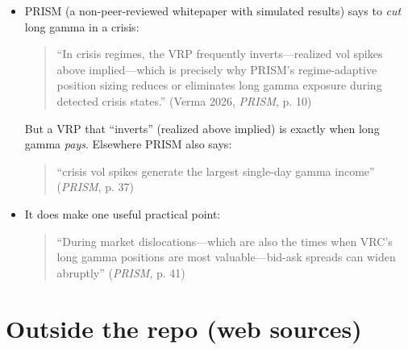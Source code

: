 \documentclass{article}
\begin{document}
\begin{itemize}

\item PRISM (a non-peer-reviewed whitepaper with simulated results) says to \emph{cut} long gamma in a crisis:

\begin{quote}``In crisis regimes, the VRP frequently inverts---realized vol spikes above implied---which is precisely why PRISM's regime-adaptive position sizing reduces or eliminates long gamma exposure during detected crisis states.'' (Verma 2026, \emph{PRISM}, p. 10)\end{quote}

But a VRP that ``inverts'' (realized above implied) is exactly when long gamma \emph{pays}. Elsewhere PRISM also says:

\begin{quote}``crisis vol spikes generate the largest single-day gamma income'' (\emph{PRISM}, p. 37)\end{quote}

\item It does make one useful practical point:

\begin{quote}``During market dislocations---which are also the times when VRC's long gamma positions are most valuable---bid-ask spreads can widen abruptly'' (\emph{PRISM}, p. 41)\end{quote}

\end{itemize}

\section{Outside the repo (web sources)}
\end{document}
